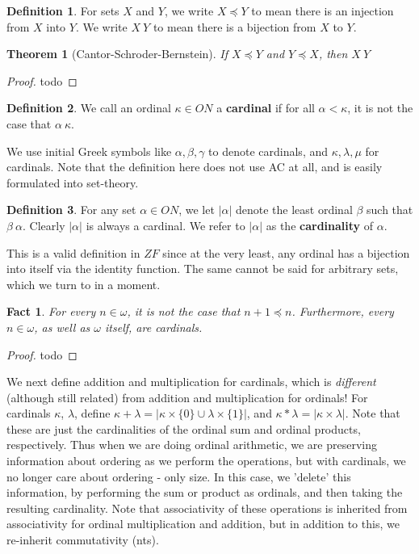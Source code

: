 \documentclass{article}
\theoremstyle{definition}
\newtheorem{definition}{Definition}[section]
\theoremstyle{plain}
\theoremstyle{theorem}
\newtheorem{fact}{Fact}[section]
\newtheorem{theorem}{Theorem}[section]
\begin{document}
\begin{definition}
	For sets $X$ and $Y$, we write $X \preceq Y$ to mean there is an injection from $X$ into $Y$. We write $X ~ Y$ to mean there is a bijection from $X$ to $Y$. 
\end{definition}
\begin{theorem}[Cantor-Schroder-Bernstein]
	If $X \preceq Y$ and $Y \preceq X$, then $X ~ Y$
\end{theorem}
\begin{proof}
	todo
\end{proof}
\begin{definition}
	We call an ordinal $\kappa \in ON$ a \textbf{cardinal} if for all $\alpha < \kappa$, it is not the case that $\alpha ~ \kappa$. 
\end{definition}
We use initial Greek symbols like $\alpha,\beta,\gamma$ to denote cardinals, and $\kappa,\lambda,\mu$ for cardinals. Note that the definition here does not use AC at all, and is easily formulated into set-theory. 
\begin{definition}
	For any set $\alpha \in ON$, we let $|\alpha|$ denote the least ordinal $\beta$ such that $\beta ~ \alpha$. Clearly $|\alpha|$ is always a cardinal. We refer to $|\alpha|$ as the \textbf{cardinality} of $\alpha$. 
\end{definition}
This is a valid definition in $ZF$ since at the very least, any ordinal has a bijection into itself via the identity function. The same cannot be said for arbitrary sets, which we turn to in a moment.
\begin{fact}
	For every $n \in \omega$, it is not the case that $n+1 \preceq n$. Furthermore, every $n \in \omega$, as well as $\omega$ itself, are cardinals.
\end{fact}
\begin{proof}
	todo
\end{proof}
We next define addition and multiplication for cardinals, which is \textit{different} (although still related) from addition and multiplication for ordinals! For cardinals $\kappa$, $\lambda$, define $\kappa + \lambda = |\kappa \times \{0\} \cup \lambda \times \{1\}|$, and $\kappa * \lambda = |\kappa \times \lambda|$. Note that these are just the cardinalities of the ordinal sum and ordinal products, respectively. Thus when we are doing ordinal arithmetic, we are preserving information about ordering as we perform the operations, but with cardinals, we no longer care about ordering - only size. In this case, we 'delete' this information, by performing the sum or product as ordinals, and then taking the resulting cardinality. Note that associativity of these operations is inherited from associativity for ordinal multiplication and addition, but in addition to this, we re-inherit commutativity (nts). \par 
\end{document}
